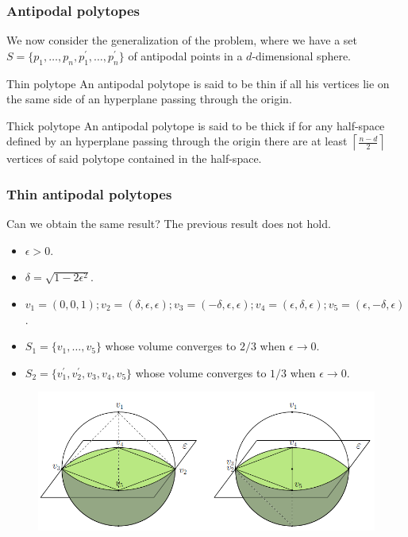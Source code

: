 \documentclass{beamer}
\begin{document}
\begin{frame}
\frametitle{Antipodal polytopes}
We now consider the generalization of the problem, where we have a set $S = \{p_{1},\dots,p_{n},p_{1}^{\prime},\dots,p_{n}^{\prime}\}$ of antipodal points in a $d$-dimensional sphere.\pause
\begin{block}{Thin polytope}
An antipodal polytope is said to be thin if all his vertices lie on the same side of an hyperplane passing through the origin.
\end{block}\pause
\begin{block}{Thick polytope}
An antipodal polytope is said to be thick if for any half-space defined by an hyperplane passing through the origin there are at least $\left \lceil{\frac{n-d}{2}}\right \rceil $ vertices of said polytope contained in the half-space.
\end{block}
\end{frame}

\begin{frame}
\frametitle{Thin antipodal polytopes}
\begin{alertblock}{Can we obtain the same result?}
The previous result does not hold.
\end{alertblock}\pause
\begin{example}
\begin{itemize}
\item<2-> $\epsilon>0$.
\item<3-> $\delta = \sqrt{1-2\epsilon^{2}}$.
\item<4-> $v_{1} = (0,0,1);v_{2}= (\delta,\epsilon,\epsilon);v_{3}= (-\delta,\epsilon,\epsilon);v_{4}= (\epsilon,\delta,\epsilon);v_{5}= (\epsilon,-\delta,\epsilon)$.
\item<5-> $S_{1} = \{v_{1},\dots,v_{5}\}$ whose volume converges to $2/3$ when $\epsilon\to 0$.
\item<6-> $S_{2} = \{v_{1}^{\prime},v_{2}^{\prime},v_{3},v_{4},v_{5}\}$ whose volume converges to $1/3$ when $\epsilon\to 0$.
\end{itemize}
\end{example}
\end{frame}

\begin{frame}
\begin{figure}
\includegraphics[scale=0.5]{esfera}
\end{figure}
\end{frame}
\end{document}
